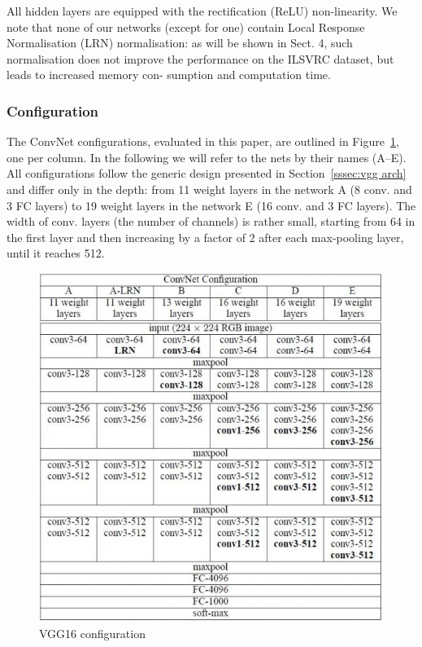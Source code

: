 \documentclass[11pt]{article}
\begin{document}
	All hidden layers are equipped with the rectification (ReLU) non-linearity.
	We note that none of our networks (except for one) contain Local Response
	Normalisation (LRN) normalisation: as will be shown in Sect. 4, such
	normalisation does not improve the performance on the ILSVRC dataset, but
	leads to increased memory con- sumption and computation time.
	\cite[1]{simonyan2015deep}

	\subsubsection{Configuration}

	The ConvNet configurations, evaluated in this paper, are outlined in
	Figure~\ref{fig:vgg16_conf}, one per column. In the following we will refer
	to the nets by their names (A–E).  All configurations follow the generic
	design presented in Section~\ref{sssec:vgg arch} and differ only in the
	depth: from 11 weight layers in the network A (8 conv. and 3 FC layers) to
	19 weight layers in the network E (16 conv. and 3 FC layers). The width of
	conv. layers (the number of channels) is rather small, starting from 64 in
	the first layer and then increasing by a factor of 2 after each max-pooling
	layer, until it reaches 512.
	\cite[3]{simonyan2015deep}

	\begin{figure}[h]
		\centering
		\includegraphics[width=\linewidth]{imgs/vgg16_conf}
		\caption{VGG16 configuration}%
		\label{fig:vgg16_conf}
	\end{figure}
\end{document}
